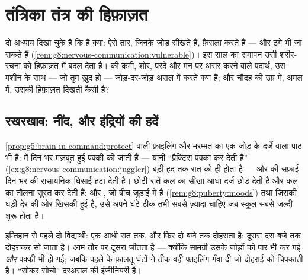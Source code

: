 \chapter{तंत्रिका तंत्र की हिफ़ाज़त}\label{ch:g8:protecting-the-nervous-system}

दो अध्याय दिखा चुके हैं कि  है क्या: ऐसे तार, जिनके जोड़
सीखते हैं, फ़ैसला करते हैं --- और ठगे भी जा सकते हैं
(\cref{rem:g8:nervous-communication:vulnerable})। इस साल का समापन उसी
शरीर-रचना को हिफ़ाज़त में बदल देता है।  की कमी, शोर, परदे और मन पर
असर करने वाले पदार्थ, उस मशीन के साथ --- जो तुम ख़ुद हो --- जोड़-दर-जोड़
असल में करते क्या हैं; और चौदह की उम्र में, अमल में, उसकी हिफ़ाज़त दिखती
कैसी है?

\section{रखरखाव: नींद, और इंद्रियों की हदें}

\begin{proposition}[नींद जोड़ों का रखरखाव है]\label{prop:g8:protecting-the-nervous-system:sleep}
\cref{prop:g5:brain-in-command:protect} वाली फ़ाइलिंग-और-मरम्मत का एक
जोड़ के दर्जे वाला पाठ भी है:  में दिन भर मज़बूत हुई
 पक्की की जाती हैं --- यानी ``प्रैक्टिस पक्का कर देती
है'' (\cref{ex:g8:nervous-communication:juggler}) बड़ी हद तक रात को ही
होता है --- और  की सफ़ाई दिन भर की रासायनिक घिसाई हटा देती है।
छोटी रातें कल का सीखा आधा दर्ज छोड़ देती हैं और कल का तौलना सुस्त कर
देती हैं: और  , जो बीच जुड़ाई में है
(\cref{rem:g8:puberty:moods}) तथा जिसकी घड़ी देर की ओर खिसकी हुई है,
उसे अपने घंटे ठीक तभी सबसे ज़्यादा चाहिए जब स्कूल सबसे जल्दी शुरू होता
है।
\end{proposition}
\admitted

\begin{example}[दोहराई की उलझन]\label{ex:g8:protecting-the-nervous-system:revision}
इम्तिहान से पहले दो विद्यार्थी: एक आधी रात तक, और फिर दो बजे तक दोहराता
है; दूसरा दस बजे तक दोहराकर सो जाता है। आम तौर पर दूसरा जीतता है ---
क्योंकि सामग्री उसके जोड़ों को पार भी कर गई \emph{और} पक्की भी हो गई;
जबकि पहले के फ़ालतू घंटों ने ठीक वही फ़ाइलिंग गँवा दी जो दोहराई को
चिपकाती है। ``सोकर सोचो'' दरअसल  की इंजीनियरी है।
\end{example}


